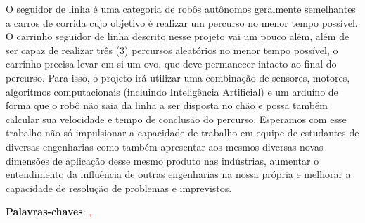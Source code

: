 \begin{resumo}
O seguidor de linha é uma categoria de robôs autônomos geralmente semelhantes a carros de corrida cujo objetivo é realizar um percurso no menor tempo possível.
O carrinho seguidor de linha descrito nesse projeto vai um pouco além, além de ser capaz de realizar três (3) percursos aleatórios no menor tempo possível, o carrinho precisa levar em si um ovo, que deve permanecer intacto ao final do percurso. 
Para isso, o projeto irá utilizar uma combinação de sensores, motores, algoritmos computacionais (incluindo Inteligência Artificial) e um arduíno de forma que o robô não saia da linha a ser disposta no chão e possa também calcular sua velocidade e tempo de conclusão do percurso.
Esperamos com esse trabalho não só impulsionar a capacidade de trabalho em equipe de estudantes de diversas engenharias como também apresentar aos mesmos diversas novas dimensões de aplicação desse mesmo produto nas indústrias, aumentar o entendimento da influência de outras engenharias na nossa própria e melhorar a capacidade de resolução de problemas e imprevistos.



\vspace{\onelineskip}
\noindent
\textbf{Palavras-chaves}: \textcolor{red}{ \imprimirpalavrachaveum, \imprimirpalavrachavedois}
\end{resumo}


    
